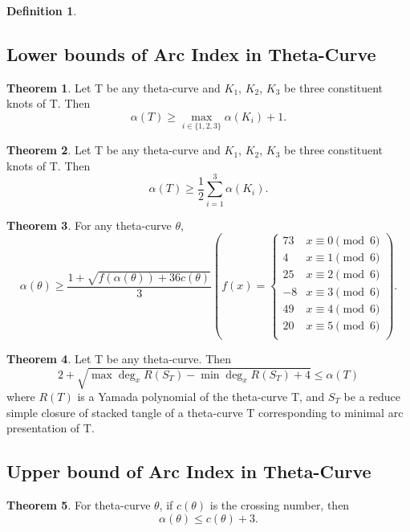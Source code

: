 \documentclass{article}
\theoremstyle{definition}
\newtheorem{defn}[thm]{Definition}
\theoremstyle{theorem}
\newtheorem{theorem}{Theorem}
\theoremstyle{proposition}
\theoremstyle{corollary}
\begin{document}
\begin{defn}
\subsection{Lower bounds of Arc Index in Theta-Curve}

\begin{theorem}
Let T be any theta-curve and $K_1$, $K_2$, $K_3$ be three constituent knots of T. Then $$\alpha(T) \geq \underset{i \in \{1,2,3\}}\max \alpha(K_i) + 1.$$
\end{theorem}

\begin{theorem}
Let T be any theta-curve and $K_1$, $K_2$, $K_3$ be three constituent knots of T. Then $$\alpha(T) \geq \frac{1}{2}\sum_{i=1}^3\alpha(K_i).$$
\end{theorem}

\begin{theorem}
For any theta-curve $\theta$, $$\alpha(\theta)\geq\frac{1+\sqrt{f(\alpha(\theta))+36c(\theta)}}{3} \left(f(x) = \begin{cases} 
		73 & x \equiv 0 \pmod 6\\ 
		4 & x \equiv 1 \pmod 6\\ 
		25 & x \equiv 2 \pmod 6\\ 
		-8 & x \equiv 3 \pmod 6\\ 
		49 & x \equiv 4 \pmod 6\\ 
		20 & x \equiv 5 \pmod 6\\ 
     \end{cases} \right).$$
\end{theorem}

\begin{theorem}
Let T be any theta-curve. Then $$2+\sqrt{\max\deg_x R(S_T) - \min\deg_x R(S_T) + 4} \leq \alpha(T)$$ where $R(T)$ is a Yamada polynomial of the theta-curve T, and $S_{T}$ be a reduce simple closure of stacked tangle of a theta-curve T corresponding to minimal arc presentation of T.
\end{theorem}

\subsection{Upper bound of Arc Index in Theta-Curve}

\begin{theorem}
For theta-curve $\theta$, if $c(\theta)$ is the crossing number, then $$\alpha(\theta) \leq c(\theta) + 3.$$
\end{theorem}


\end{defn}
\end{document}
